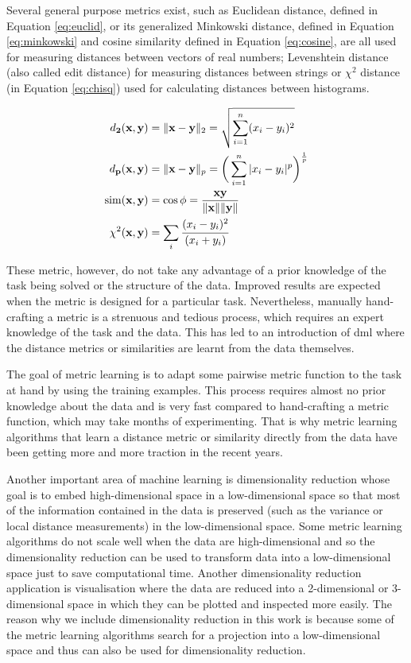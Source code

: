\documentclass[12pt,a4paper]{report}
\begin{document}
Several general purpose metrics exist, such as Euclidean distance, defined in Equation \ref{eq:euclid}, or its generalized Minkowski distance, defined in Equation \ref{eq:minkowski} and cosine similarity defined in Equation \ref{eq:cosine}, are all used for measuring distances between vectors of real numbers; Levenshtein distance (also called edit distance) for measuring distances between strings or $\chi^2$ distance (in Equation \ref{eq:chisq}) used for calculating distances between histograms.

\begin{align}
d_{\mathbf{2}}(\textbf{x}, \textbf{y}) &= \|\textbf{x}-\textbf{y}\|_2 = \sqrt{\sum_{i=1}^{n} (x_i-y_i)^2} \label{eq:euclid} \\
d_{\mathbf{p}}(\textbf{x}, \textbf{y}) &= \|\textbf{x}-\textbf{y}\|_p = \bigg(\sum_{i=1}^{n} |x_i-y_i|^p\bigg)^\frac{1}{p} \label{eq:minkowski} \\
\mathrm{sim}(\textbf{x}, \textbf{y}) &= \cos{\phi} = \frac{\textbf{x}\textbf{y}}{\|\textbf{x}\|\|\textbf{y}\|} \label{eq:cosine} \\
\chi^2(\textbf{x}, \textbf{y}) &= \sum_{i} \cfrac{(x_i - y_i)^2} {(x_i + y_i)} \label{eq:chisq}
\end{align}

These metric, however, do not take any advantage of a prior knowledge of the task being solved or the structure of the data. Improved results are expected when the metric is designed for a particular task. Nevertheless, manually hand-crafting a metric is a strenuous and tedious process, which requires an expert knowledge of the task and the data. This has led to an introduction of \ac{dml} where the distance metrics or similarities are learnt from the data themselves.

The goal of metric learning is to adapt some pairwise metric function to the task at hand by using the training examples. This process requires almost no prior knowledge about the data and is very fast compared to hand-crafting a metric function, which may take months of experimenting. That is why metric learning algorithms that learn a distance metric or similarity directly from the data have been getting more and more traction in the recent years.

Another important area of machine learning is dimensionality reduction whose goal is to embed high-dimensional space in a low-dimensional space so that most of the information contained in the data is preserved (such as the variance or local distance measurements) in the low-dimensional space. Some metric learning algorithms do not scale well when the data are high-dimensional and so the dimensionality reduction can be used to transform data into a low-dimensional space just to save computational time. Another dimensionality reduction application is visualisation where the data are reduced into a 2-dimensional or 3-dimensional space in which they can be plotted and inspected more easily. The reason why we include dimensionality reduction in this work is because some of the metric learning algorithms search for a projection into a low-dimensional space and thus can also be used for dimensionality reduction.
\end{document}
